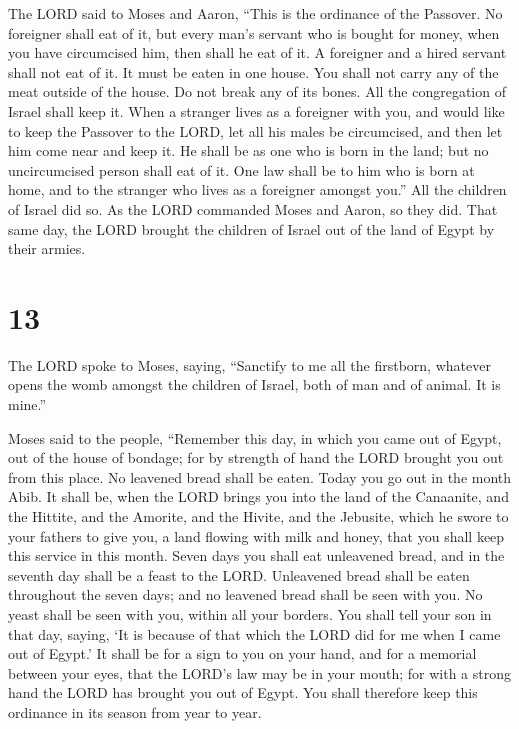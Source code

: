  The LORD said to Moses and Aaron, ``This is the ordinance
of the Passover. No foreigner shall eat of it,  but every
man's servant who is bought for money, when you have circumcised him,
then shall he eat of it.  A foreigner and a hired servant
shall not eat of it.  It must be eaten in one house. You
shall not carry any of the meat outside of the house. Do not break any
of its bones.  All the congregation of Israel shall keep
it.  When a stranger lives as a foreigner with you, and
would like to keep the Passover to the LORD, let all his males be
circumcised, and then let him come near and keep it. He shall be as one
who is born in the land; but no uncircumcised person shall eat of it.
 One law shall be to him who is born at home, and to the
stranger who lives as a foreigner amongst you.''  All the
children of Israel did so. As the LORD commanded Moses and Aaron, so
they did.  That same day, the LORD brought the children of
Israel out of the land of Egypt by their armies.

\hypertarget{section-12}{%
\section{13}\label{section-12}}

 The LORD spoke to Moses, saying,  ``Sanctify to
me all the firstborn, whatever opens the womb amongst the children of
Israel, both of man and of animal. It is mine.''

 Moses said to the people, ``Remember this day, in which you
came out of Egypt, out of the house of bondage; for by strength of hand
the LORD brought you out from this place. No leavened bread shall be
eaten.  Today you go out in the month Abib.  It
shall be, when the LORD brings you into the land of the Canaanite, and
the Hittite, and the Amorite, and the Hivite, and the Jebusite, which he
swore to your fathers to give you, a land flowing with milk and honey,
that you shall keep this service in this month.  Seven days
you shall eat unleavened bread, and in the seventh day shall be a feast
to the LORD.  Unleavened bread shall be eaten throughout the
seven days; and no leavened bread shall be seen with you. No yeast shall
be seen with you, within all your borders.  You shall tell
your son in that day, saying, `It is because of that which the LORD did
for me when I came out of Egypt.'  It shall be for a sign to
you on your hand, and for a memorial between your eyes, that the LORD's
law may be in your mouth; for with a strong hand the LORD has brought
you out of Egypt.  You shall therefore keep this ordinance
in its season from year to year.

